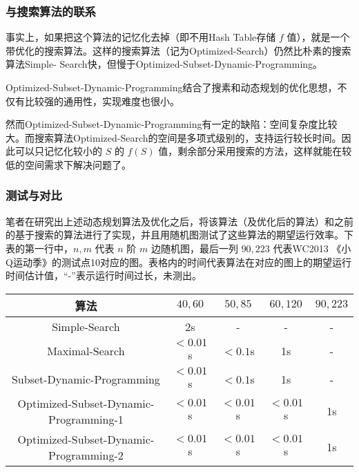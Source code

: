 \documentclass[lang=cn,11pt,a4paper]{elegantpaper}
\begin{document}
\subsubsection{与搜索算法的联系}
事实上，如果把这个算法的记忆化去掉（即不用Hash Table存储 $f$ 值），就是一个带优化的搜索算法。这样的搜索算法（记为Optimized-Search）仍然比朴素的搜索算法Simple- Search快，但慢于Optimized-Subset-Dynamic-Programming。

Optimized-Subset-Dynamic-Programming结合了搜素和动态规划的优化思想，不仅有比较强的通用性，实现难度也很小。

然而Optimized-Subset-Dynamic-Programming有一定的缺陷：空间复杂度比较大。而搜索算法Optimized-Search的空间是多项式级别的，支持运行较长时间。因此可以只记忆化较小的 $S$ 的 $f(S)$ 值，剩余部分采用搜索的方法，这样就能在较低的空间需求下解决问题了。

\subsubsection{测试与对比}
笔者在研究出上述动态规划算法及优化之后，将该算法（及优化后的算法）和之前的基于搜索的算法进行了实现，并且用随机图测试了这些算法的期望运行效率。下表的第一行中，$n, m$ 代表 $n$ 阶 $m$ 边随机图，最后一列 $90, 223$ 代表WC2013 《小Q运动季》的测试点10对应的图。表格内的时间代表算法在对应的图上的期望运行时间估计值，“-”表示运行时间过长，未测出。

\begin{center}
    \begin{table}[!h]
        \centering
        \begin{tabular}{c|c|c|c|c}
            \hline
            算法 & $40, 60$ & $50, 85$ & $60, 120$ & $90, 223$ \\
            \hline
            Simple-Search & 2s & - & - & - \\
            \hline
            Maximal-Search & $<0.01$s & $<0.1$s & 1s & - \\
            \hline
            Subset-Dynamic-Programming & $<0.01$s & $<0.1$s & 1s & - \\
            \hline
            Optimized-Subset-Dynamic-Programming-1 & $<0.01$s & $<0.01$s & $<0.01$s & 1s \\
            \hline
            Optimized-Subset-Dynamic-Programming-2 & $<0.01$s & $<0.01$s & $<0.01$s & 1s \\
            \hline
        \end{tabular}            
    \end{table}
\end{center}
\end{document}
